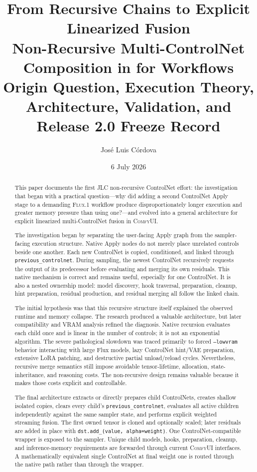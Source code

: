 \documentclass[11pt]{article}
\title{\textbf{From Recursive Chains to Explicit Linearized Fusion}\\[0.25em]
\Large Non-Recursive Multi-ControlNet Composition in \ComfyUI{} for \FluxOne{} Workflows\\[0.65em]
\large Origin Question, Execution Theory, Architecture, Validation, and Release 2.0 Freeze Record}
\author{Jos\'e Luis C\'ordova}
\date{6 July 2026}
\newcommand{\FluxOne}{\textsc{Flux.1}}
\newcommand{\ComfyUI}{\textsc{ComfyUI}}
\newcommand{\JLC}{\textsc{JLC}}
\newcommand{\code}[1]{\texttt{#1}}
\begin{document}
\maketitle

\begin{abstract}
This paper documents the first \JLC{} non-recursive ControlNet effort: the investigation that began with a practical question---why did adding a second ControlNet Apply stage to a demanding \FluxOne{} workflow produce disproportionately longer execution and greater memory pressure than using one?---and evolved into a general architecture for explicit linearized multi-ControlNet fusion in \ComfyUI{}.

The investigation began by separating the user-facing Apply graph from the sampler-facing execution structure. Native Apply nodes do not merely place unrelated controls beside one another. Each new ControlNet is copied, conditioned, and linked through \code{previous\_controlnet}. During sampling, the newest ControlNet recursively requests the output of its predecessor before evaluating and merging its own residuals. This native mechanism is correct and remains useful, especially for one ControlNet. It is also a nested ownership model: model discovery, hook traversal, preparation, cleanup, hint preparation, residual production, and residual merging all follow the linked chain.

The initial hypothesis was that this recursive structure itself explained the observed runtime and memory collapse. The research produced a valuable architecture, but later compatibility and VRAM analysis refined the diagnosis. Native recursion evaluates each child once and is linear in the number of controls; it is not an exponential algorithm. The severe pathological slowdown was traced primarily to forced \code{--lowvram} behavior interacting with large Flux models, lazy ControlNet hint/VAE preparation, extensive LoRA patching, and destructive partial unload/reload cycles. Nevertheless, recursive merge semantics still impose avoidable tensor-lifetime, allocation, state-inheritance, and reasoning costs. The non-recursive design remains valuable because it makes those costs explicit and controllable.

The final architecture extracts or directly prepares child ControlNets, creates shallow isolated copies, clears every child’s \code{previous\_controlnet}, evaluates all active children independently against the same sampler state, and performs explicit weighted streaming fusion. The first owned tensor is cloned and optionally scaled; later residuals are added in place with \code{dst.add\_(value, alpha=weight)}. One ControlNet-compatible wrapper is exposed to the sampler. Unique child models, hooks, preparation, cleanup, and inference-memory requirements are forwarded through current \ComfyUI{} interfaces. A mathematically equivalent single ControlNet at final weight one is routed through the native path rather than through the wrapper.


\end{abstract}
\end{document}
